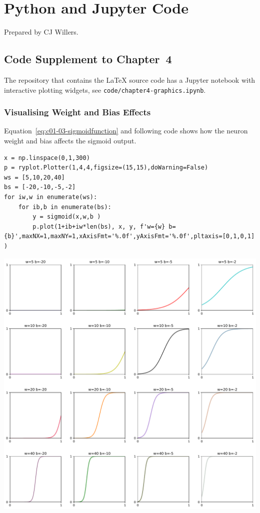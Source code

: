 
\chapter{Python and Jupyter Code}
\label{sec:PythonandJupyterCode}

Prepared by CJ Willers.


\section{Code Supplement to Chapter~4}
\label{sec:CodeSupplementtoChapter4}



The repository that contains the \LaTeX{} source code has a Jupyter notebook with interactive plotting widgets, see \lstinline{code/chapter4-graphics.ipynb}.

\subsection{Visualising Weight and Bias Effects}
\label{sec:VisualisingWeightandBiasEffects}

Equation~\ref{eq:c01-03-sigmoidfunction} and following code shows how the neuron weight and bias affects the sigmoid output.

\begin{lstlisting}
x = np.linspace(0,1,300)
p = ryplot.Plotter(1,4,4,figsize=(15,15),doWarning=False)
ws = [5,10,20,40]
bs = [-20,-10,-5,-2]
for iw,w in enumerate(ws):
    for ib,b in enumerate(bs):
        y = sigmoid(x,w,b )
        p.plot(1+ib+iw*len(bs), x, y, f'w={w} b={b}',maxNX=1,maxNY=1,xAxisFmt='%.0f',yAxisFmt='%.0f',pltaxis=[0,1,0,1] )
\end{lstlisting}

{\centering \includegraphics[width=\textwidth,]{eps/sigmoid4x4plot} \par}

